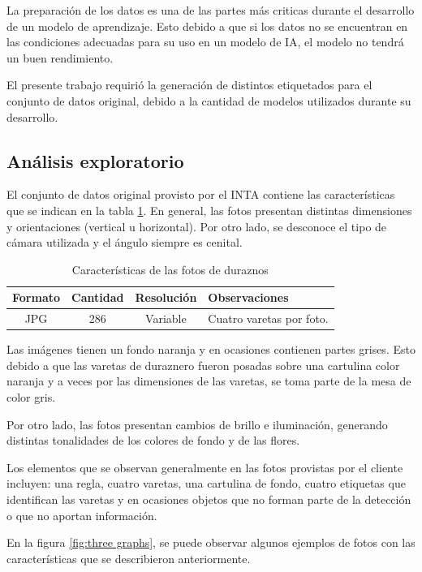 La preparación de los datos es una de las partes más criticas durante el desarrollo de un modelo de aprendizaje. Esto debido a que si los datos no se encuentran en las condiciones adecuadas para su uso en un modelo de IA, el modelo no tendrá un buen rendimiento. 

El presente trabajo requirió la generación de distintos etiquetados para el conjunto de datos original, debido a la cantidad de modelos utilizados durante su desarrollo.

\subsection{Análisis exploratorio}
\label{section3.2.1}
El conjunto de datos original provisto por el INTA contiene las características que se indican en la tabla \ref{tab:flores}. En general, las fotos presentan distintas dimensiones y orientaciones (vertical u horizontal). Por otro lado, se desconoce el tipo de cámara utilizada y el ángulo siempre es cenital.


\begin{table}[h]
	\centering
	\caption{Características de las fotos de duraznos}
	\begin{tabular}{c c c l}    
		\toprule
		\textbf{Formato}     & \textbf{Cantidad} & \textbf{Resolución} & \textbf{Observaciones}\\
		\midrule
		JPG                  & 286               &  Variable &  Cuatro varetas por foto.\\		
		\bottomrule
		\hline
	\end{tabular}
	\label{tab:flores}
\end{table}
 
Las imágenes tienen un fondo naranja y en ocasiones contienen partes grises. Esto debido a que las varetas de duraznero fueron posadas sobre una cartulina color naranja y a veces por las dimensiones de las varetas, se toma parte de la mesa de color gris.

Por otro lado, las fotos presentan cambios de brillo e iluminación, generando distintas tonalidades de los colores de fondo y de las flores. 

Los elementos que se observan generalmente en las fotos provistas por el cliente incluyen: una regla, cuatro varetas, una cartulina de fondo, cuatro etiquetas que identifican las varetas y en ocasiones objetos que no forman parte de la detección o que no aportan información.

En la figura \ref{fig:three graphs}, se puede observar algunos ejemplos de fotos con las características que se describieron anteriormente.

